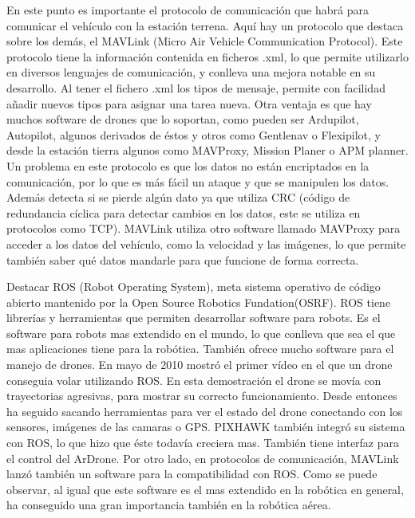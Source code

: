\hspace{1 cm} En este punto es importante el protocolo de comunicaci\'on que habr\'a para comunicar el veh\'iculo con la estaci\'on terrena. Aqu\'i hay un protocolo que destaca sobre los dem\'as, el MAVLink (Micro Air Vehicle Communication Protocol). Este protocolo tiene la informaci\'on contenida en ficheros .xml, lo que permite utilizarlo en diversos lenguajes de comunicaci\'on, y conlleva una mejora notable en su desarrollo. Al tener el fichero .xml los tipos de mensaje, permite con facilidad añadir nuevos tipos para asignar una tarea nueva. Otra ventaja es que hay muchos software de drones que lo soportan, como pueden ser Ardupilot, Autopilot, algunos derivados de \'estos y otros como Gentlenav o Flexipilot, y desde la estaci\'on tierra algunos como MAVProxy, Mission Planer o APM planner. 
Un problema en este protocolo es que los datos no est\'an encriptados en la comunicaci\'on, por lo que es m\'as f\'acil un ataque y que se manipulen los datos. Adem\'as detecta si se pierde alg\'un dato ya que utiliza CRC (c\'odigo de redundancia c\'iclica para detectar cambios en los datos, este se utiliza en protocolos como TCP).
MAVLink utiliza otro software llamado MAVProxy para acceder a los datos del veh\'iculo, como la velocidad y las im\'agenes, lo que permite tambi\'en saber qu\'e datos mandarle para que funcione de forma correcta. 

\hspace{1 cm} Destacar ROS (Robot Operating System), meta sistema operativo de c\'odigo abierto mantenido por la Open Source Robotics Fundation(OSRF). ROS tiene librer\'ias y herramientas que permiten desarrollar software para robots. Es el software para robots mas extendido en el mundo, lo que conlleva que sea el que mas aplicaciones tiene para la rob\'otica. Tambi\'en ofrece mucho software para el manejo de drones. En mayo de 2010 mostr\'o el primer v\'ideo en el que un drone conseguia volar utilizando ROS. En esta demostraci\'on el drone se mov\'ia con trayectorias agresivas, para mostrar su correcto funcionamiento. Desde entonces ha seguido sacando herramientas para ver el estado del drone conectando con los sensores, im\'agenes de las camaras o GPS. PIXHAWK tambi\'en integr\'o su sistema con ROS, lo que hizo que \'este todav\'ia creciera mas. Tambi\'en tiene interfaz para el control del ArDrone. Por otro lado, en protocolos de comunicaci\'on, MAVLink lanz\'o tambi\'en un software para la compatibilidad con ROS. Como se puede observar, al igual que este software es el mas extendido en la rob\'otica en general, ha conseguido una gran importancia tambi\'en en la rob\'otica a\'erea.



